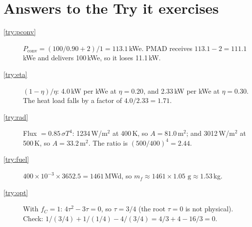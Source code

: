 \documentclass[11pt]{article}
\numberwithin{equation}{section}
\numberwithin{table}{section}
\newcommand{\Pconv}{P_\text{conv}}
\begin{document}
\section{Answers to the Try it exercises}\label{app:answers}
\begin{description}
  \item[\ref{try:pconv}] $\Pconv = (100/0.90 + 2)/1 = 113.1$\,kWe. PMAD receives $113.1-2 = 111.1$\,kWe
        and delivers 100\,kWe, so it loses 11.1\,kW.
  \item[\ref{try:eta}] $(1-\eta)/\eta$: 4.0\,kW per kWe at $\eta=0.20$, and 2.33\,kW per kWe at
        $\eta=0.30$. The heat load falls by a factor of $4.0/2.33=1.71$.
  \item[\ref{try:rad}] Flux $=0.85\,\sigma T^4$: 1234\,W/m$^2$ at 400\,K, so $A=81.0$\,m$^2$; and
        3012\,W/m$^2$ at 500\,K, so $A=33.2$\,m$^2$. The ratio is $(500/400)^4=2.44$.
  \item[\ref{try:fuel}] $400\times10^{-3}\times3652.5=1461$\,MWd, so $m_f\approx1461\times1.05\text{ g}\approx1.53$\,kg.
  \item[\ref{try:opt}] With $f_C=1$: $4\tau^2-3\tau=0$, so $\tau=3/4$ (the root $\tau=0$ is not
        physical). Check: $1/(3/4)+1/(1/4)-4/(3/4)=4/3+4-16/3=0$.
\end{description}

\end{document}
